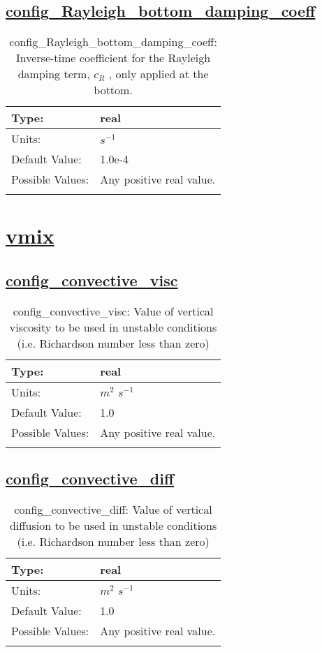 \subsection[config\_Rayleigh\_bottom\_damping\_coeff]{\hyperref[sec:nm_tab_Rayleigh_damping]{config\_Rayleigh\_bottom\_damping\_coeff}}
\label{subsec:nm_sec_config_Rayleigh_bottom_damping_coeff}
\begin{center}
\begin{longtable}{| p{2.0in} || p{4.0in} |}
    \hline
    Type: & real \\
    \hline
    Units: & $s^{-1}$ \\
    \hline
    Default Value: & 1.0e-4 \\
    \hline
    Possible Values: & Any positive real value. \\
    \hline
    \caption{config\_Rayleigh\_bottom\_damping\_coeff:  Inverse-time coefficient for the Rayleigh damping term,  $c_R$ , only applied at the bottom.}
\end{longtable}
\end{center}
\section[vmix]{\hyperref[sec:nm_tab_vmix]{vmix}}
\label{sec:nm_sec_vmix}
\subsection[config\_convective\_visc]{\hyperref[sec:nm_tab_vmix]{config\_convective\_visc}}
\label{subsec:nm_sec_config_convective_visc}
\begin{center}
\begin{longtable}{| p{2.0in} || p{4.0in} |}
    \hline
    Type: & real \\
    \hline
    Units: & $m^2$ $s^{-1}$ \\
    \hline
    Default Value: & 1.0 \\
    \hline
    Possible Values: & Any positive real value. \\
    \hline
    \caption{config\_convective\_visc: Value of vertical viscosity to be used in unstable conditions (i.e. Richardson number less than zero)}
\end{longtable}
\end{center}
\subsection[config\_convective\_diff]{\hyperref[sec:nm_tab_vmix]{config\_convective\_diff}}
\label{subsec:nm_sec_config_convective_diff}
\begin{center}
\begin{longtable}{| p{2.0in} || p{4.0in} |}
    \hline
    Type: & real \\
    \hline
    Units: & $m^2$ $s^{-1}$ \\
    \hline
    Default Value: & 1.0 \\
    \hline
    Possible Values: & Any positive real value. \\
    \hline
    \caption{config\_convective\_diff: Value of vertical diffusion to be used in unstable conditions (i.e. Richardson number less than zero)}
\end{longtable}
\end{center}
